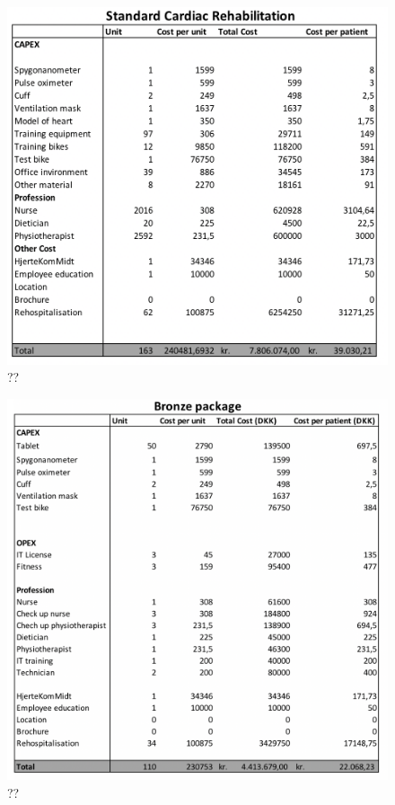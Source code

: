 \begin{figure}[H]
\centering
\includegraphics[width=1\textwidth]{Figure/SCR.png}
\caption{??}
\label{fig: SCR}
\end{figure} 
\begin{figure}[H]
\centering
\includegraphics[width=1\textwidth]{Figure/Bronze.png}
\caption{??}
\label{fig: Bronze}
\end{figure} 

